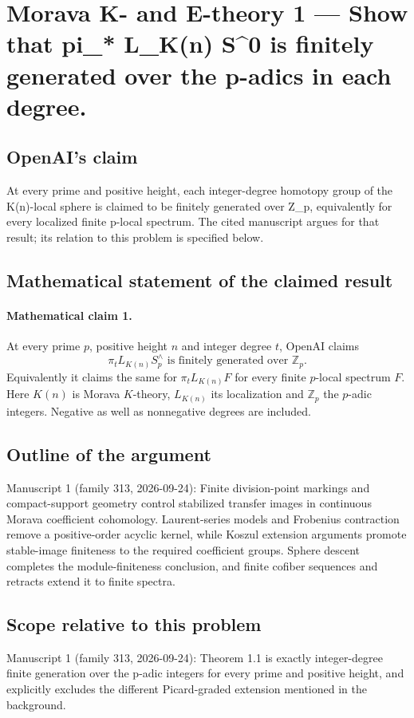 \documentclass[11pt]{article}
\begin{document}
\section*{Morava K- and E-theory 1 — Show that pi\_* L\_K(n) S\textasciicircum{}0 is finitely generated over the p-adics in each degree.}

\subsection{OpenAI's claim}
At every prime and positive height, each integer-degree homotopy group of the K(n)-local sphere is claimed to be finitely generated over Z\_p, equivalently for every localized finite p-local spectrum. The cited manuscript argues for that result; its relation to this problem is specified below.

\subsection{Mathematical statement of the claimed result}
\paragraph{Mathematical claim 1.} At every prime $p$, positive height $n$ and integer degree $t$, OpenAI claims
\[
\pi_tL_{K(n)}S_p^\wedge\text{ is finitely generated over }\mathbb Z_p.
\]
Equivalently it claims the same for $\pi_tL_{K(n)}F$ for every finite $p$-local spectrum $F$. Here $K(n)$ is Morava $K$-theory, $L_{K(n)}$ its localization and $\mathbb Z_p$ the $p$-adic integers. Negative as well as nonnegative degrees are included.

\subsection{Outline of the argument}
Manuscript 1 (family 313, 2026-09-24): Finite division-point markings and compact-support geometry control stabilized transfer images in continuous Morava coefficient cohomology. Laurent-series models and Frobenius contraction remove a positive-order acyclic kernel, while Koszul extension arguments promote stable-image finiteness to the required coefficient groups. Sphere descent completes the module-finiteness conclusion, and finite cofiber sequences and retracts extend it to finite spectra.

\subsection{Scope relative to this problem}
Manuscript 1 (family 313, 2026-09-24): Theorem 1.1 is exactly integer-degree finite generation over the p-adic integers for every prime and positive height, and explicitly excludes the different Picard-graded extension mentioned in the background.
\end{document}
